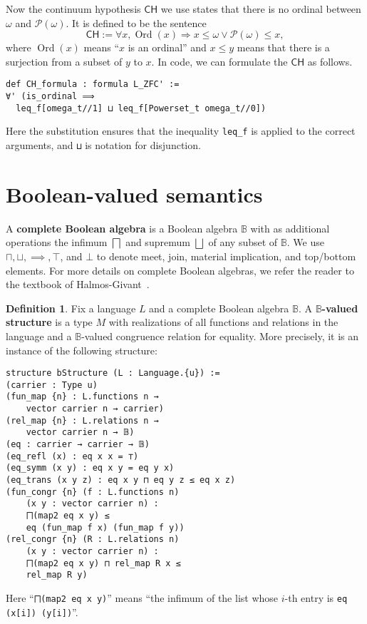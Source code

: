 \documentclass[sigplan,10pt,review, autoref,anonymous]{acmart}
\newcommand{\B}{\mathbb{B}}
\newcommand{\lil}{\lstinline}
\newcommand{\CH}{\mathsf{CH}}
\theoremstyle{definition}
\newtheorem{defn}{Definition}[section]
\DeclareMathOperator{\Ord}{Ord}
\begin{document}
Now the continuum hypothesis \(\CH\) we use states that there is no ordinal between \(\omega\) and \(\mathcal{P}(\omega)\). It is defined to be the sentence
\[\CH:=\forall x, \Ord(x) \Rightarrow x \le \omega \vee \mathcal{P}(\omega) \le x,\]
where \(\Ord(x)\) means ``\(x\) is an ordinal'' and \(x \le y\) means that there is a surjection from a subset of \(y\) to \(x\). In code, we can formulate the \(\CH\) as follows.
\begin{lstlisting}
def CH_formula : formula L_ZFC' :=
∀' (is_ordinal ⟹
  leq_f[omega_t//1] ⊔ leq_f[Powerset_t omega_t//0])
\end{lstlisting}
Here the substitution ensures that the inequality \lil{leq_f} is applied to the correct arguments, and \lil{⊔} is notation for disjunction.

\section{Boolean-valued semantics}
\label{section:boolean-semantics}

A \textbf{complete Boolean algebra} is a Boolean algebra $\B$ with as additional operations the infimum $\bigsqcap$ and supremum $\bigsqcup$ of any subset of $\B$.
We use $\sqcap, \sqcup, \implies, \top$, and $\bot$ to denote meet, join, material implication, and top/bottom elements.
For more details on complete Boolean algebras, we refer the reader to the textbook of Halmos-Givant~\cite{givant2008introduction}.

\begin{defn}\label{def-boolean-valued-structure}
  Fix a language $L$ and a complete Boolean algebra $\B$. A \textbf{$\B$-valued structure} is a type $M$ with realizations of all functions and relations in the language and a $\B$-valued congruence relation for equality. More precisely, it is an instance of the following structure:
  \begin{lstlisting}
structure bStructure (L : Language.{u}) :=
(carrier : Type u)
(fun_map {n} : L.functions n →
    vector carrier n → carrier)
(rel_map {n} : L.relations n →
    vector carrier n → 𝔹)
(eq : carrier → carrier → 𝔹)
(eq_refl (x) : eq x x = ⊤)
(eq_symm (x y) : eq x y = eq y x)
(eq_trans (x y z) : eq x y ⊓ eq y z ≤ eq x z)
(fun_congr {n} (f : L.functions n)
    (x y : vector carrier n) :
    ⨅(map2 eq x y) ≤
    eq (fun_map f x) (fun_map f y))
(rel_congr {n} (R : L.relations n)
    (x y : vector carrier n) :
    ⨅(map2 eq x y) ⊓ rel_map R x ≤
    rel_map R y)
\end{lstlisting}
Here ``\lstinline{⨅(map2 eq x y)}'' means ``the infimum of the list whose $i$-th entry is \lil{eq (x[i]) (y[i])}''.
\end{defn}
\end{document}
